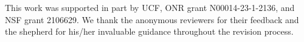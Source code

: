 This work was supported in part by UCF, ONR grant N00014-23-1-2136, and NSF grant 2106629. 
We thank the anonymous reviewers for their feedback and the shepherd for his/her invaluable guidance throughout the revision process. 


